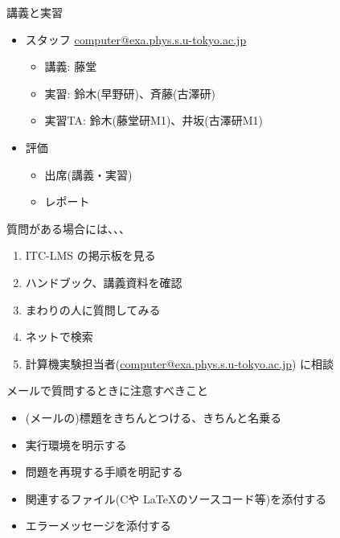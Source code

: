 \begin{frame}[t,fragile]{講義と実習}
  \begin{itemize}
    \setlength{\itemsep}{1em}
  \item スタッフ \href{mailto:computer@exa.phys.s.u-tokyo.ac.jp}{computer@exa.phys.s.u-tokyo.ac.jp}
    \begin{itemize}
    \item 講義: 藤堂
    \item 実習: 鈴木(早野研)、斉藤(古澤研)
    \item 実習TA: 鈴木(藤堂研M1)、井坂(古澤研M1)
    \end{itemize}
  \item 評価
    \begin{itemize}
    \item 出席(講義・実習)
    \item レポート
    \end{itemize}    
  \end{itemize}    
\end{frame}

\begin{frame}[t]{質問がある場合には、、、}
  \begin{enumerate}
  \item ITC-LMS の掲示板を見る
  \item ハンドブック、講義資料を確認
  \item まわりの人に質問してみる
  \item ネットで検索
  \item 計算機実験担当者(\href{mailto:computer@exa.phys.s.u-tokyo.ac.jp}{computer@exa.phys.s.u-tokyo.ac.jp}) に相談
  \end{enumerate}
  メールで質問するときに注意すべきこと
  \begin{itemize}
  \item (メールの)標題をきちんとつける、きちんと名乗る
  \item 実行環境を明示する
  \item 問題を再現する手順を明記する
  \item 関連するファイル(Cや \LaTeX のソースコード等)を添付する
  \item エラーメッセージを添付する
  \end{itemize}
\end{frame}

